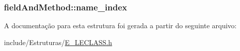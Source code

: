\subsubsection[{name\+\_\+index}]{ field\+And\+Method\+::name\+\_\+index}\label{structfield_and_method_ac636d7076db5a2ce9891613be8ad9b00}


A documentação para esta estrutura foi gerada a partir do seguinte arquivo\+:\begin{DoxyCompactItemize}
\item 
include/\+Estruturas/\hyperlink{_e___l_e_c_l_a_s_s_8h}{E\+\_\+\+L\+E\+C\+L\+A\+S\+S.\+h}\end{DoxyCompactItemize}
